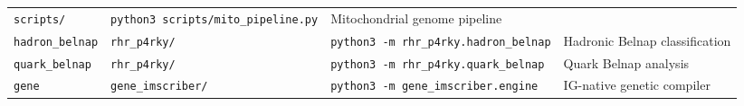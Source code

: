 \documentclass[12pt,a4paper]{article}
\begin{document}
\begin{longtable}[]{@{}llll@{}}
\begin{minipage}[t]{0.24\columnwidth}
\texttt{scripts/}\strut
\end{minipage} & \begin{minipage}[t]{0.19\columnwidth}\raggedright
\texttt{python3\ scripts/mito\_pipeline.py}\strut
\end{minipage} & \begin{minipage}[t]{0.28\columnwidth}\raggedright
Mitochondrial genome pipeline\strut
\end{minipage}\tabularnewline
\begin{minipage}[t]{0.17\columnwidth}\raggedright
\texttt{hadron\_belnap}\strut
\end{minipage} & \begin{minipage}[t]{0.24\columnwidth}\raggedright
\texttt{rhr\_p4rky/}\strut
\end{minipage} & \begin{minipage}[t]{0.19\columnwidth}\raggedright
\texttt{python3\ -m\ rhr\_p4rky.hadron\_belnap}\strut
\end{minipage} & \begin{minipage}[t]{0.28\columnwidth}\raggedright
Hadronic Belnap classification\strut
\end{minipage}\tabularnewline
\begin{minipage}[t]{0.17\columnwidth}\raggedright
\texttt{quark\_belnap}\strut
\end{minipage} & \begin{minipage}[t]{0.24\columnwidth}\raggedright
\texttt{rhr\_p4rky/}\strut
\end{minipage} & \begin{minipage}[t]{0.19\columnwidth}\raggedright
\texttt{python3\ -m\ rhr\_p4rky.quark\_belnap}\strut
\end{minipage} & \begin{minipage}[t]{0.28\columnwidth}\raggedright
Quark Belnap analysis\strut
\end{minipage}\tabularnewline
\begin{minipage}[t]{0.17\columnwidth}\raggedright
\texttt{gene}\strut
\end{minipage} & \begin{minipage}[t]{0.24\columnwidth}\raggedright
\texttt{gene\_imscriber/}\strut
\end{minipage} & \begin{minipage}[t]{0.19\columnwidth}\raggedright
\texttt{python3\ -m\ gene\_imscriber.engine}\strut
\end{minipage} & \begin{minipage}[t]{0.28\columnwidth}\raggedright
IG-native genetic compiler\strut

\end{minipage}
\end{longtable}
\end{document}
